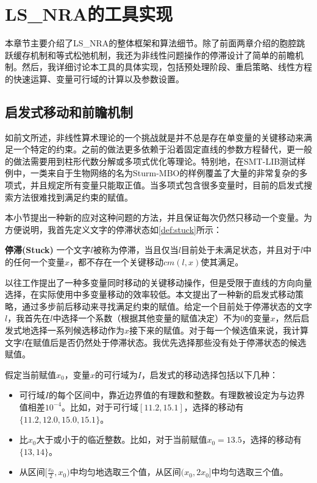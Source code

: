 \chapter{LS\_NRA的工具实现}\label{chap:implementation}

本章节主要介绍了LS\_NRA的整体框架和算法细节。除了前面两章介绍的胞腔跳跃缓存机制和等式松弛机制，我还为非线性问题操作的停滞设计了简单的前瞻机制。然后，我详细讨论本工具的具体实现，包括预处理阶段、重启策略、线性方程的快速运算、变量可行域的计算以及参数设置。

\section{启发式移动和前瞻机制}
如前文所述，非线性算术理论的一个挑战就是并不总是存在单变量的关键移动来满足一个特定的约束。之前的做法更多依赖于沿着固定直线的参数方程替代\cite{LiXZ23}，更一般的做法需要用到柱形代数分解或多项式优化等理论。特别地，在SMT-LIB测试样例中，一类来自于生物网络\cite{AkutsuHT08}的名为Sturm-MBO的样例覆盖了大量的非常复杂的多项式，并且规定所有变量只能取正值。当多项式包含很多变量时，目前的启发式搜索方法很难找到满足约束的赋值。

本小节提出一种新的应对这种问题的方法，并且保证每次仍然只移动一个变量。为方便说明，我首先定义文字的停滞状态如\ref{def:stuck}所示：

\begin{definition}{\textbf{停滞(Stuck)}}
    一个文字$l$被称为停滞，当且仅当$l$目前处于未满足状态，并且对于$l$中的任何一个变量$x$，都不存在一个关键移动$cm(l, x)$使其满足。
\label{def:stuck}
\end{definition}

以往工作\cite{LiXZ23}提出了一种多变量同时移动的关键移动操作，但是受限于直线的方向向量选择，在实际使用中多变量移动的效率较低。本文提出了一种新的启发式移动策略，通过多步前后移动来寻找满足约束的赋值。给定一个目前处于停滞状态的文字$l$，我首先在$l$中选择一个系数（根据其他变量的赋值决定）不为0的变量$x$，然后启发式地选择一系列候选移动作为$x$接下来的赋值。对于每一个候选值来说，我计算文字$l$在赋值后是否仍然处于停滞状态。我优先选择那些没有处于停滞状态的候选赋值。

假定当前赋值$x_0$，变量$x$的可行域为$I$，启发式的移动选择包括以下几种：
\begin{itemize}
    \item 可行域$I$的每个区间中，靠近边界值的有理数和整数。有理数被设定为与边界值相差$10^{-4}$。比如，对于可行域$[11.2, 15.1]$，选择的移动有$\{11.2, 12.0, 15.0, 15.1\}$。
    \item 比$x_0$大于或小于的临近整数。比如，对于当前赋值$x_0 = 13.5$，选择的移动有$\{13, 14\}$。
    \item 从区间$[\frac{x_0}{2}, x_0)$中均匀地选取三个值，从区间$(x_0, 2x_0]$中均匀选取三个值。
\label{en:look-ahead}
\end{itemize}

